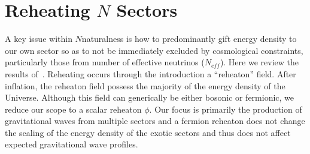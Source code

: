 \documentclass[nofootinbib,twocolumn,preprintnumbers]{revtex4-1}
\begin{document}
\section{Reheating $N$ Sectors}
\label{sec:reheat}
A key issue within $N$naturalness is how to predominantly gift energy density to our own sector so as to not be immediately excluded by cosmological constraints, particularly those from number of effective neutrinos ($N_{eff}$). Here we review the results of~\cite{Arkani-Hamed:2016rle}. Reheating occurs through the introduction a ``reheaton'' field. After inflation, the reheaton field possess the majority of the energy density of the Universe. Although this field can generically be either bosonic or fermionic, we reduce our scope to a scalar reheaton $\phi$. Our focus is primarily the production of gravitational waves from multiple sectors and a fermion reheaton does not change the scaling of the energy density of the exotic sectors and thus does not affect expected gravitational wave profiles.
\end{document}
